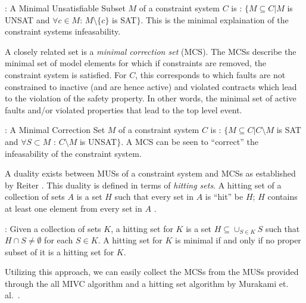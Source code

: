 \begin{definition} : A Minimal Unsatisfiable Subset $M$ of a constraint system $C$ is : $\{M \subseteq C | M$ is UNSAT and $\forall c \in M$: $M \setminus \{c\}$ is SAT$\}$. This is the minimal explaination of the constraint systems infeasability. \\
\end{definition}

A closely related set is a \textit{minimal correction set} (MCS). The MCSs describe the minimal set of model elements for which if constraints are removed, the constraint system is satisfied. For $C$, this corresponds to which faults are not constrained to inactive (and are hence active) and violated contracts which lead to the violation of the safety property. In other words, the minimal set of active faults and/or violated properties that lead to the top level event.  \\

\begin{definition} : A Minimal Correction Set $M$ of a constraint system $C$ is : $\{M \subseteq C | C \setminus M$ is SAT and $\forall S \subset M$ : $C \setminus M$ is UNSAT$\}$. A MCS can be seen to ``correct'' the infeasability of the constraint system.\\
\end{definition}

A duality exists between MUSs of a constraint system and MCSs as established by Reiter \cite{reiter1987theory}. This duality is defined in terms of \textit{hitting sets}. A hitting set of a collection of sets $A$ is a set $H$ such that every set in $A$ is ``hit'' be $H$; $H$ contains at least one element from every set in $A$ \cite{liffiton2016fast}. \\

\begin{definition}: Given a collection of sets $K$, a hitting set for $K$ is a set $H \subseteq \cup_{S \in K} S$ such that $H \cap S \neq \emptyset$ for each $S  \in K$. A hitting set for $K$ is minimal if and only if no proper subset of it is a hitting set for $K$. \\
\end{definition}

Utilizing this approach, we can easily collect the MCSs from the MUSs provided through the all MIVC algorithm and a hitting set algorithm by Murakami et. al.~\cite{murakami2013efficient,gainer2017minimal}. \\

